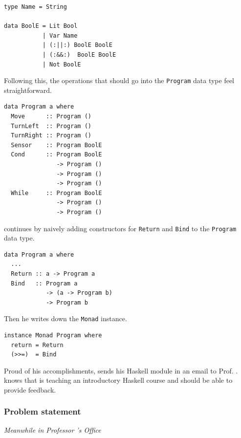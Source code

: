 \pagebreak
\begin{small} 
\begin{verbatim}
type Name = String

data BoolE = Lit Bool
           | Var Name
           | (:||:) BoolE BoolE
           | (:&&:)  BoolE BoolE
           | Not BoolE  
\end{verbatim} 
\end{small}  

Following this, the  operations that should go into the {\tt Program} data type 
feel straightforward.

\begin{small} 
\begin{verbatim}
data Program a where 
  Move      :: Program () 
  TurnLeft  :: Program () 
  TurnRight :: Program () 
  Sensor    :: Program BoolE
  Cond      :: Program BoolE 
               -> Program () 
               -> Program ()
               -> Program ()  
  While     :: Program BoolE 
               -> Program () 
               -> Program () 
\end{verbatim} 
\end{small} 

\studname{} continues by naively adding constructors for {\tt Return} and 
{\tt Bind} to the {\tt Program} data type.   

\begin{small} 
\begin{verbatim}
data Program a where 
  ...
  Return :: a -> Program a 
  Bind   :: Program a 
            -> (a -> Program b)
            -> Program b 
\end{verbatim} 
\end{small} 

Then he writes down the {\tt Monad} instance.
 
\begin{small} 
\begin{verbatim}
instance Monad Program where 
  return = Return 
  (>>=)  = Bind 
\end{verbatim} 
\end{small} 

Proud of his accomplishments, \studname{} sends his Haskell module in an 
email to Prof. \docname{}. \studname{} knows that \docname{} is teaching an 
introductory Haskell course and should be able to provide feedback.



\subsubsection{Problem statement} 
\emph{Meanwhile in Professor \docname{}'s Office}\newline %


